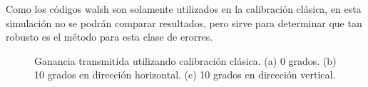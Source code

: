 Como los códigos walsh son solamente utilizados en la calibración clásica, en esta simulación no se podrán comparar 
resultados, pero sirve para determinar que tan robusto es el método para esta clase de erorres.
\begin{figure}[H]
	\centering
 	
		\caption{Ganancia transmitida utilizando calibración clásica. (a) 0 grados. (b) 10 grados en 
		dirección horizontal. (c) 10 grados en dirección vertical.}
	\label{fig:wallErrorClassical}
\end{figure}
